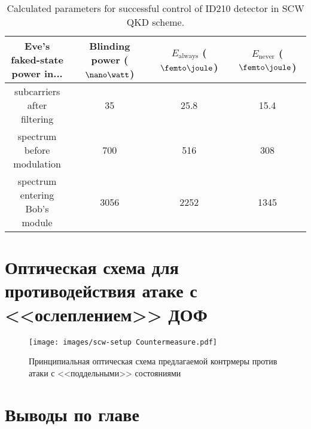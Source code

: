 \begin{table}
	\caption{\label{tab:blinding}Calculated parameters for successful control of ID210 detector in SCW QKD scheme.}
	\begin{tabular}[t]{c c c c}
	\hline\hline
	\makecell{Eve's faked-state\\ power in...} & \makecell{Blinding\\ power ($\nano\watt$)} & $E_\text{always}$ ($\femto\joule$) & $E_\text{never}$ ($\femto\joule$) \\
	\hline
	\makecell{subcarriers after\\ filtering} & 35 & 25.8 & 15.4 \\
	\makecell{spectrum before\\ modulation} & 700 & 516 & 308 \\
	\makecell{spectrum entering\\ Bob's module} & 3056 & 2252 & 1345 \\
	\hline\hline
	\end{tabular}
\end{table}


\pagebreak

\section{Оптическая схема для противодействия атаке с <<ослеплением>> ДОФ} \label{ch:ch3/sec4}


 \begin{figure}[ht]
  \centering
  \texttt{[image: images/scw-setup Countermeasure.pdf]}
  \caption{Принципиальная оптическая схема предлагаемой контрмеры против атаки с <<поддельными>> состояниями}
  \label{fig:countermeasure}
\end{figure}

\pagebreak
\section{} \label{ch:ch3/sec5}


\pagebreak
\section{Выводы по главе} \label{ch:ch3/sect6}